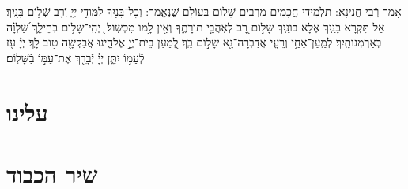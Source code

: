 \documentclass[twoside, openany, parskip=half, 11pt]{book}
\begin{document}
\vspace{-.3\baselineskip}
אָמַר רְֿבִי חֲנִינָא: תַּלְמִידֵי חֲכָמִים מַרְבִּים שָׁלוֹם בָּעוֹלָם שֶׁנֶּאֱמַר: וְכׇל־בָּנַ֖יִךְ לִמּוּדֵ֣י יְיָ֑ וְֿרַ֖ב שְֿׁל֥וֹם בָּנָֽיִךְ׃ אַל תִּקְרָא בָּנַֽיִךְ אֶלָּא בּוֹנַֽיִךְ שָׁל֣וֹם רָ֭ב לְֿאֹֽהֲבֵ֣י תוֹרָתֶ֑ךָ וְֿאֵ֖ין לָ֣מוֹ מִכְשֽׁוֹל׃  ֖ יְֿהִֽי־שָׁל֥וֹם בְּֿחֵילֵ֑ךְ שַׁ֝לְוָ֗ה בְּֿאַרְמְֿנוֹתָֽיִךְ׃ לְֿמַֽעַן־אַחַ֥י וְֿרֵעָ֑י אֲדַבְּֿרָה־נָּ֖א שָׁל֣וֹם בָּֽךְ׃ לְֿ֭מַעַן בֵּית־יְיָ֣ אֱלֹהֵ֑ינוּ אֲבַקְשָׁ֖ה ט֣וֹב לָֽךְ׃ יְיָ֗ עֹ֖ז לְֿעַמּ֣וֹ יִתֵּ֑ן יְיָ֓ יְֿבָרֵ֖ךְ אֶת־עַמּ֣וֹ בַֿשָּׁלֽוֹם׃

\mournerskaddish

\section*{ עלינו }

\aleinu



\clearpage

\vspace{-1\baselineskip}
\section*{ שיר הכבוד }
\label{shir_shel_shabbos}
\end{document}
